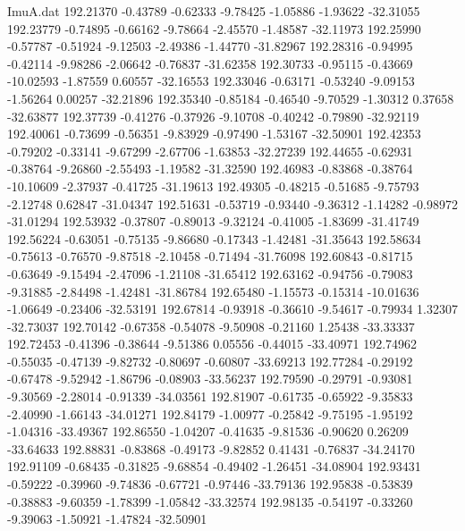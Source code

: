 \begin{filecontents}{ImuA.dat}
 192.21370   -0.43789   -0.62333   -9.78425   -1.05886   -1.93622  -32.31055
 192.23779   -0.74895   -0.66162   -9.78664   -2.45570   -1.48587  -32.11973
 192.25990   -0.57787   -0.51924   -9.12503   -2.49386   -1.44770  -31.82967
 192.28316   -0.94995   -0.42114   -9.98286   -2.06642   -0.76837  -31.62358
 192.30733   -0.95115   -0.43669  -10.02593   -1.87559    0.60557  -32.16553
 192.33046   -0.63171   -0.53240   -9.09153   -1.56264    0.00257  -32.21896
 192.35340   -0.85184   -0.46540   -9.70529   -1.30312    0.37658  -32.63877
 192.37739   -0.41276   -0.37926   -9.10708   -0.40242   -0.79890  -32.92119
 192.40061   -0.73699   -0.56351   -9.83929   -0.97490   -1.53167  -32.50901
 192.42353   -0.79202   -0.33141   -9.67299   -2.67706   -1.63853  -32.27239
 192.44655   -0.62931   -0.38764   -9.26860   -2.55493   -1.19582  -31.32590
 192.46983   -0.83868   -0.38764  -10.10609   -2.37937   -0.41725  -31.19613
 192.49305   -0.48215   -0.51685   -9.75793   -2.12748    0.62847  -31.04347
 192.51631   -0.53719   -0.93440   -9.36312   -1.14282   -0.98972  -31.01294
 192.53932   -0.37807   -0.89013   -9.32124   -0.41005   -1.83699  -31.41749
 192.56224   -0.63051   -0.75135   -9.86680   -0.17343   -1.42481  -31.35643
 192.58634   -0.75613   -0.76570   -9.87518   -2.10458   -0.71494  -31.76098
 192.60843   -0.81715   -0.63649   -9.15494   -2.47096   -1.21108  -31.65412
 192.63162   -0.94756   -0.79083   -9.31885   -2.84498   -1.42481  -31.86784
 192.65480   -1.15573   -0.15314  -10.01636   -1.06649   -0.23406  -32.53191
 192.67814   -0.93918   -0.36610   -9.54617   -0.79934    1.32307  -32.73037
 192.70142   -0.67358   -0.54078   -9.50908   -0.21160    1.25438  -33.33337
 192.72453   -0.41396   -0.38644   -9.51386    0.05556   -0.44015  -33.40971
 192.74962   -0.55035   -0.47139   -9.82732   -0.80697   -0.60807  -33.69213
 192.77284   -0.29192   -0.67478   -9.52942   -1.86796   -0.08903  -33.56237
 192.79590   -0.29791   -0.93081   -9.30569   -2.28014   -0.91339  -34.03561
 192.81907   -0.61735   -0.65922   -9.35833   -2.40990   -1.66143  -34.01271
 192.84179   -1.00977   -0.25842   -9.75195   -1.95192   -1.04316  -33.49367
 192.86550   -1.04207   -0.41635   -9.81536   -0.90620    0.26209  -33.64633
 192.88831   -0.83868   -0.49173   -9.82852    0.41431   -0.76837  -34.24170
 192.91109   -0.68435   -0.31825   -9.68854   -0.49402   -1.26451  -34.08904
 192.93431   -0.59222   -0.39960   -9.74836   -0.67721   -0.97446  -33.79136
 192.95838   -0.53839   -0.38883   -9.60359   -1.78399   -1.05842  -33.32574
 192.98135   -0.54197   -0.33260   -9.39063   -1.50921   -1.47824  -32.50901

\end{filecontents}
